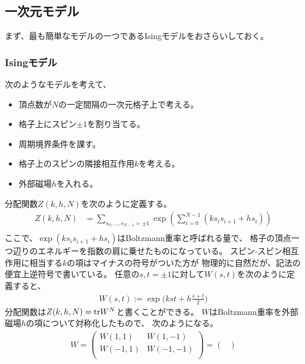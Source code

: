 {\subsection{一次元モデル}\label{s2:一次元モデル} %
	まず、最も簡単なモデルの一つであるIsingモデルをおさらいしておく。

\subsubsection{Isingモデル}\label{s3:Isingモデル} %
	次のようなモデルを考えて、
	\begin{itemize}\setlength{\itemsep}{-1mm} %
		\item 頂点数が$N$の一定間隔の一次元格子上で考える。
		\item 格子上にスピン$\pm1$を割り当てる。
		\item 周期境界条件を課す。
		\item 格子上のスピンの隣接相互作用$k$を考える。
		\item 外部磁場$h$を入れる。
	\end{itemize} %
	分配関数$Z(k,h,N)$を次のように定義する。
	\begin{equation*}\begin{split}
		Z(k,h,N) &= \sum_{s_0,\dots,s_{N-1}=\pm1} 
			\exp\left(\sum_{i=0}^{N-1}(ks_is_{i+1}+hs_i)\right) \\
	\end{split}\end{equation*}
	ここで、$\exp(ks_is_{i+1}+hs_i)$はBoltzmann重率と呼ばれる量で、
	格子の頂点一つ辺りのエネルギーを指数の肩に乗せたものになっている。
	スピン-スピン相互作用に相当する$k$の項はマイナスの符号がついた方が
	物理的に自然だが、記法の便宜上逆符号で書いている。
	任意の$s,t=\pm1$に対して$W(s,t)$を次のように定義すると、
	\begin{equation*}\begin{split}
		W(s,t) := \exp\bigl(kst + h\frac{s+t}{2}\bigr)
	\end{split}\end{equation*}
	分配関数は$Z(k,h,N)={\operatorname{tr}} W^N$と書くことができる。
	$W$はBoltzmann重率を外部磁場$h$の項について対称化したもので、
	次のようになる。
	\begin{equation}\label{eq:転送行列その一}\begin{split}
		W = \begin{pmatrix}
			W(1,1) & W(1,-1) \\ W(-1,1) & W(-1,-1) \\
		\end{pmatrix} = \begin{pmatrix}

\end{pmatrix}
\end{split}
\end{equation}}
